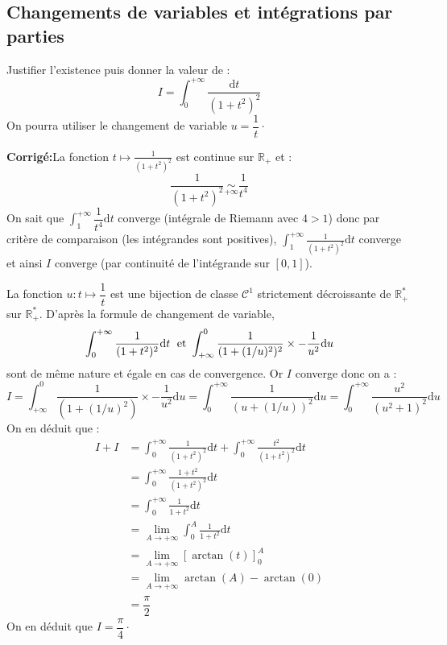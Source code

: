 \documentclass[a4paper,twoside,french,10pt]{VcCours}
\newcommand{\dt}{\text{d}t}
\newcommand{\corr}{\textbf{Corrigé:}}
\begin{document}
 
\medskip


\subsection{Changements de variables et intégrations par parties}


\medskip


\begin{Exercice}{} Justifier l'existence puis donner la valeur de :
  \[
  I = \int_{0}^{ + \infty} \frac{\dt}{(1 + t^{2})^{2}}
  \]
On pourra utiliser le changement de variable $u = \dfrac{1}{t} \cdot$
\end{Exercice}

\corr La fonction $t \mapsto \frac{1}{(1 + t^{2})^{2}}$ est continue sur $\mathbb{R}_+$ et :
$$ \frac{1}{(1 + t^{2})^{2}} \underset{+ \infty}{\sim} \dfrac{1}{t^4}$$
On sait que $\int_1^{+ \infty} \dfrac{1}{t^4} \dt$ converge (intégrale de Riemann avec $4>1$) donc par critère de comparaison (les intégrandes sont positives), $ \int_1^{+ \infty}  \frac{1}{(1 + t^{2})^{2}} \dt$ converge et ainsi $I$ converge (par continuité de l'intégrande sur $[0,1]$).

\medskip

\noindent La fonction $u : t \mapsto \dfrac{1}{t}$ est une bijection de classe $\mathcal{C}^1$ strictement décroissante de $\mathbb{R}_+^*$ sur $\mathbb{R}_+^*$. D'après la formule de changement de variable,
$$ \int_0^{+ \infty}  \frac{1}{(1 + t^{2})^{2}} \dt \; \hbox{ et } \int_{+ \infty}^0 \dfrac{1}{(1+(1/u)^2)^2} \times -\dfrac{1}{u^2} \textrm{d}u$$
sont de même nature et égale en cas de convergence. Or $I$ converge donc on a :
$$ I = \int_{+ \infty}^0 \dfrac{1}{(1+(1/u)^2)} \times -\dfrac{1}{u^2} \textrm{d}u = \int_{0}^{+ \infty} \dfrac{1}{(u+(1/u))^2}  \textrm{d}u    =    \int_{0}^{+ \infty} \dfrac{u^2}{(u^2+1)^2}  \textrm{d}u $$
On en déduit que :
\begin{align*}
I+I & = \int_0^{+ \infty}  \frac{1}{(1 + t^{2})^{2}} \dt + \int_0^{+ \infty}  \frac{t^2}{(1 + t^{2})^{2}} \dt\\
& = \int_0^{+ \infty}  \frac{1+t^2}{(1 + t^{2})^{2}} \dt \\
& = \int_0^{+ \infty}  \frac{1}{1 + t^{2}} \dt \\
& = \lim_{A \rightarrow + \infty} \int_0^{A}  \frac{1}{1 + t^{2}} \dt \\
& = \lim_{A \rightarrow + \infty} \left[ \arctan(t) \right]_0^A \\
& = \lim_{A \rightarrow + \infty} \arctan(A)- \arctan(0) \\
& = \dfrac{\pi}{2}
\end{align*}
On en déduit que $I = \dfrac{\pi}{4} \cdot$
\end{document}
